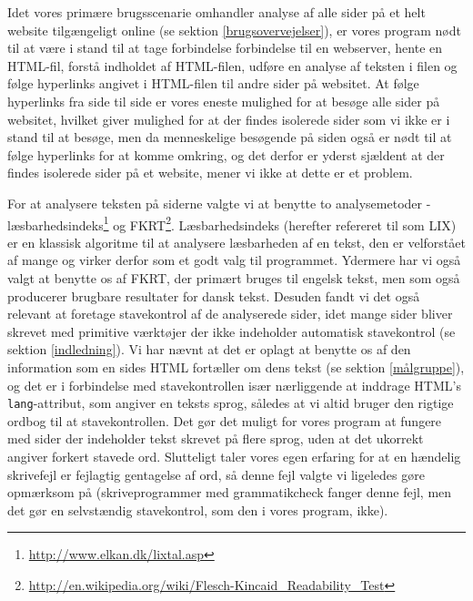 \documentclass[a4paper,oneside,article]{memoir}
\begin{document}
Idet vores primære brugsscenarie omhandler analyse af alle sider på et
helt website tilgængeligt online (se sektion \ref{brugsovervejelser}),
er vores program nødt til at være i stand til at tage forbindelse
forbindelse til en webserver, hente en HTML-fil, forstå indholdet af
HTML-filen, udføre en analyse af teksten i filen og følge hyperlinks
angivet i HTML-filen til andre sider på websitet. At følge hyperlinks
fra side til side er vores eneste mulighed for at besøge alle sider på
websitet, hvilket giver mulighed for at der findes isolerede sider som
vi ikke er i stand til at besøge, men da menneskelige besøgende på
siden også er nødt til at følge hyperlinks for at komme omkring, og
det derfor er yderst sjældent at der findes isolerede sider på et
website, mener vi ikke at dette er et problem.

For at analysere teksten på siderne valgte vi at benytte to
analysemetoder -
læsbarhedsindeks\footnote{\url{http://www.elkan.dk/lixtal.asp}} og
FKRT\footnote{\url{http://en.wikipedia.org/wiki/Flesch-Kincaid_Readability_Test}}.
Læsbarhedsindeks (herefter refereret til som LIX) er en klassisk
algoritme til at analysere læsbarheden af en tekst, den er velforstået
af mange og virker derfor som et godt valg til programmet. Ydermere
har vi også valgt at benytte os af FKRT, der primært bruges til
engelsk tekst, men som også producerer brugbare resultater for dansk
tekst. Desuden fandt vi det også relevant at foretage stavekontrol af
de analyserede sider, idet mange sider bliver skrevet med primitive
værktøjer der ikke indeholder automatisk stavekontrol (se sektion
\ref{indledning}). Vi har nævnt at det er oplagt at benytte os af den
information som en sides HTML fortæller om dens tekst (se sektion
\ref{målgruppe}), og det er i forbindelse med stavekontrollen især
nærliggende at inddrage HTML's \texttt{lang}-attribut, som angiver en
teksts sprog, således at vi altid bruger den rigtige ordbog til at
stavekontrollen. Det gør det muligt for vores program at fungere med
sider der indeholder tekst skrevet på flere sprog, uden at det
ukorrekt angiver forkert stavede ord. Slutteligt taler vores egen
erfaring for at en hændelig skrivefejl er fejlagtig gentagelse af ord,
så denne fejl valgte vi ligeledes gøre opmærksom på (skriveprogrammer
med grammatikcheck fanger denne fejl, men det gør en selvstændig
stavekontrol, som den i vores program, ikke).
\end{document}
